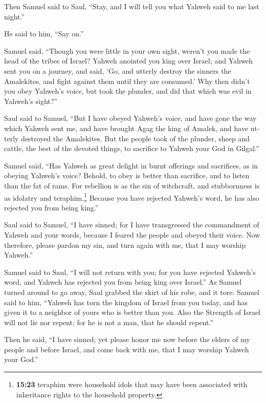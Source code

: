\begin{paracol}{2}
\begin{otherlanguage}{english}
 Then Samuel said to Saul, ``Stay, and I will tell you
what Yahweh said to me last night.''

He said to him, ``Say on.''

 Samuel said, ``Though you were little in your own sight,
weren't you made the head of the tribes of Israel? Yahweh anointed you
king over Israel;  and Yahweh sent you on a journey, and
said, `Go, and utterly destroy the sinners the Amalekites, and fight
against them until they are consumed.'  Why then didn't
you obey Yahweh's voice, but took the plunder, and did that which was
evil in Yahweh's sight?''

 Saul said to Samuel, ``But I have obeyed Yahweh's voice,
and have gone the way which Yahweh sent me, and have brought Agag the
king of Amalek, and have utterly destroyed the Amalekites.
 But the people took of the plunder, sheep and cattle,
the best of the devoted things, to sacrifice to Yahweh your God in
Gilgal.''

 Samuel said, ``Has Yahweh as great delight in burnt
offerings and sacrifices, as in obeying Yahweh's voice? Behold, to obey
is better than sacrifice, and to listen than the fat of rams.
 For rebellion is as the sin of witchcraft, and
stubbornness is as idolatry and teraphim.\footnote{\textbf{15:23}
  teraphim were household idols that may have been associated with
  inheritance rights to the household property.} Because you have
rejected Yahweh's word, he has also rejected you from being king.''

 Saul said to Samuel, ``I have sinned; for I have
transgressed the commandment of Yahweh and your words, because I feared
the people and obeyed their voice.  Now therefore, please
pardon my sin, and turn again with me, that I may worship Yahweh.''

 Samuel said to Saul, ``I will not return with you; for
you have rejected Yahweh's word, and Yahweh has rejected you from being
king over Israel.''  As Samuel turned around to go away,
Saul grabbed the skirt of his robe, and it tore.  Samuel
said to him, ``Yahweh has torn the kingdom of Israel from you today, and
has given it to a neighbor of yours who is better than you.
 Also the Strength of Israel will not lie nor repent; for
he is not a man, that he should repent.''

 Then he said, ``I have sinned; yet please honor me now
before the elders of my people and before Israel, and come back with me,
that I may worship Yahweh your God.''


\end{otherlanguage}
\end{paracol}
